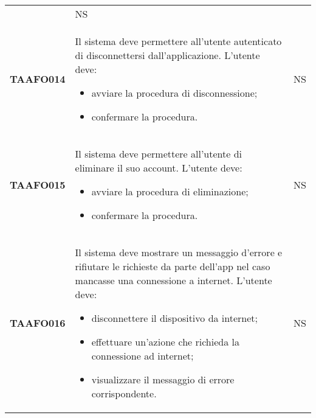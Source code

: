 \documentclass[../piano-di-qualifica.tex]{subfiles}
\begin{document}
\begin{centering}
\begin{longtable}[H]{>{\centering\bfseries}m{3cm} >{}p{10cm} >{\centering\arraybackslash}m{3cm}}
                      & NS \\
        TAAFO014      & Il sistema deve permettere all'utente autenticato di disconnettersi dall'applicazione. \newline
                      L'utente deve:
                      \begin{itemize}
                        \item avviare la procedura di disconnessione;
                        \item confermare la procedura.
                      \end{itemize}
                      & NS \\
        TAAFO015      & Il sistema deve permettere all'utente di eliminare il suo account. \newline
                      L'utente deve:
                      \begin{itemize}
                        \item avviare la procedura di eliminazione;
                        \item confermare la procedura.
                      \end{itemize}
                      & NS \\
        TAAFO016      & Il sistema deve mostrare un messaggio d'errore e rifiutare le richieste da parte dell'app nel caso mancasse una connessione a internet. \newline
                      L'utente deve:
                      \begin{itemize}
                        \item disconnettere il dispositivo da internet;
                        \item effettuare un'azione che richieda la connessione ad internet;
                        \item visualizzare il messaggio di errore corrispondente.
                      \end{itemize}
                      & NS \\



\end{longtable}
\end{centering}
\end{document}

